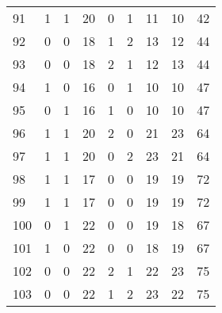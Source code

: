 \documentclass{article}
\begin{document}
\begin{center}
\begin{tabular}{lrrrrrrrr}
91 & 1 & 1 & 20 & 0 & 1 & 11 & 10 & 42 \\
92 & 0 & 0 & 18 & 1 & 2 & 13 & 12 & 44 \\
93 & 0 & 0 & 18 & 2 & 1 & 12 & 13 & 44 \\
94 & 1 & 0 & 16 & 0 & 1 & 10 & 10 & 47 \\
95 & 0 & 1 & 16 & 1 & 0 & 10 & 10 & 47 \\
96 & 1 & 1 & 20 & 2 & 0 & 21 & 23 & 64 \\
97 & 1 & 1 & 20 & 0 & 2 & 23 & 21 & 64 \\
98 & 1 & 1 & 17 & 0 & 0 & 19 & 19 & 72 \\
99 & 1 & 1 & 17 & 0 & 0 & 19 & 19 & 72 \\
100 & 0 & 1 & 22 & 0 & 0 & 19 & 18 & 67 \\
101 & 1 & 0 & 22 & 0 & 0 & 18 & 19 & 67 \\
102 & 0 & 0 & 22 & 2 & 1 & 22 & 23 & 75 \\
103 & 0 & 0 & 22 & 1 & 2 & 23 & 22 & 75 \\
\bottomrule
\end{tabular}


\end{center}
\end{document}
